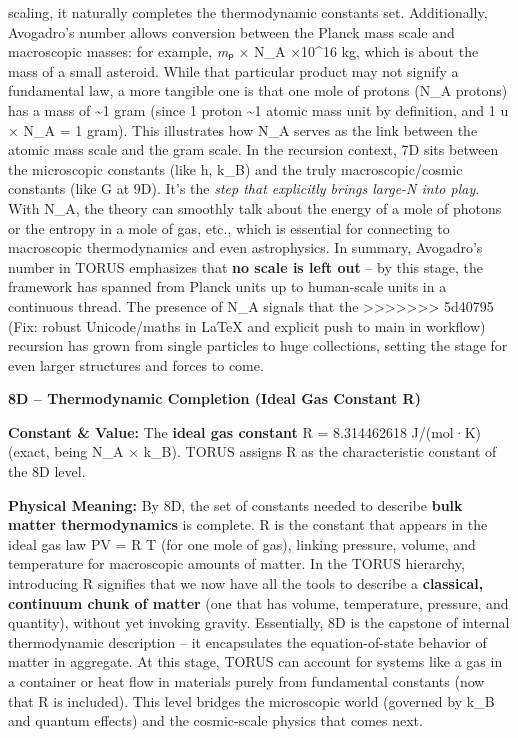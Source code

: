 \documentclass[]{article}
\begin{document}
scaling, it naturally completes the thermodynamic constants set.
Additionally, Avogadro's number allows conversion between the Planck
mass scale and macroscopic masses: for example, \emph{m}ₚ × N\_A ×10\^{}16 kg​, which is about the mass of a small asteroid. While
that particular product may not signify a fundamental law, a more
tangible one is that one mole of protons (N\_A protons) has a mass of
\textasciitilde{}1 gram (since 1 proton \textasciitilde{}1 atomic mass
unit by definition, and 1 u × N\_A = 1 gram). This illustrates how N\_A
serves as the link between the atomic mass scale and the gram scale​. In
the recursion context, 7D sits between the microscopic constants (like
h, k\_B) and the truly macroscopic/cosmic constants (like G at 9D). It's
the \emph{step that explicitly brings large-N into play}. With N\_A, the
theory can smoothly talk about the energy of a mole of photons or the
entropy in a mole of gas, etc., which is essential for connecting to
macroscopic thermodynamics and even astrophysics. In summary, Avogadro's
number in TORUS emphasizes that \textbf{no scale is left out} -- by this
stage, the framework has spanned from Planck units up to human-scale
units in a continuous thread​. The presence of N\_A signals that the
>>>>>>> 5d40795 (Fix: robust Unicode/maths in LaTeX and explicit push to main in workflow)
recursion has grown from single particles to huge collections, setting
the stage for even larger structures and forces to come.

\textbf{8D -- Thermodynamic Completion (Ideal Gas Constant R)}

\textbf{Constant \& Value:} The \textbf{ideal gas constant} R =
8.314462618 J/(mol·K) (exact, being N\_A × k\_B)​. TORUS assigns R as
the characteristic constant of the 8D level.

\textbf{Physical Meaning:} By 8D, the set of constants needed to
describe \textbf{bulk matter thermodynamics} is complete. R is the
constant that appears in the ideal gas law PV = R T (for one mole of
gas), linking pressure, volume, and temperature for macroscopic amounts
of matter​. In the TORUS hierarchy, introducing R signifies that we now
have all the tools to describe a \textbf{classical, continuum chunk of
matter} (one that has volume, temperature, pressure, and quantity),
without yet invoking gravity. Essentially, 8D is the capstone of
internal thermodynamic description -- it encapsulates the
equation-of-state behavior of matter in aggregate. At this stage, TORUS
can account for systems like a gas in a container or heat flow in
materials purely from fundamental constants (now that R is included).
This level bridges the microscopic world (governed by k\_B and quantum
effects) and the cosmic-scale physics that comes next.
\end{document}
